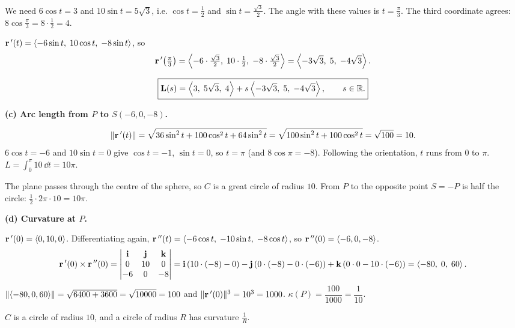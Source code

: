  We need $6\cos t=3$ and $10\sin t=5\sqrt3$, i.e.
$\cos t=\frac12$ and $\sin t=\frac{\sqrt3}{2}$. The angle with these values is
$t=\frac\pi3$. The third coordinate agrees: $8\cos\frac\pi3=8\cdot\frac12=4$.\checkok

 $\mathbf{r}\,'(t)=\left\langle -6\sin t,\;10\cos t,\;-8\sin t \right\rangle$, so
\[
  \mathbf{r}\,'\!\left(\tfrac\pi3\right)=\left\langle -6\cdot\tfrac{\sqrt3}{2},\;10\cdot\tfrac12,\;-8\cdot\tfrac{\sqrt3}{2} \right\rangle
  =\left\langle -3\sqrt3,\;5,\;-4\sqrt3 \right\rangle.
\]

\[
  \boxed{\mathbf L(s)=\left\langle 3,\;5\sqrt3,\;4 \right\rangle+s\left\langle -3\sqrt3,\;5,\;-4\sqrt3 \right\rangle,\qquad s\in\mathbb{R} .}
\]

\textbf{(c) Arc length from $P$ to $S(-6,0,-8)$.}

\[
  \lVert\mathbf{r}\,'(t)\rVert=\sqrt{36\sin^2t+100\cos^2t+64\sin^2t}=\sqrt{100\sin^2t+100\cos^2t}=\sqrt{100}=10 .
\]
 $6\cos t=-6$ and $10\sin t=0$ give $\cos t=-1$, $\sin t=0$,
so $t=\pi$ (and $8\cos\pi=-8$\checkok). Following the orientation, $t$ runs from $0$ to $\pi$.
 $L=\displaystyle\int_0^\pi10\,\dd t=10\pi$.


\begin{altmethod}
The plane passes through the centre of the sphere, so $C$ is a great circle of
radius $10$. From $P$ to the opposite point $S=-P$ is half the circle:
$\frac12\cdot2\pi\cdot10=10\pi$.
\end{altmethod}

\textbf{(d) Curvature at $P$.}

 $\mathbf{r}\,'(0)=\left\langle 0,10,0 \right\rangle$. Differentiating again,
$\mathbf{r}\,''(t)=\left\langle -6\cos t,\;-10\sin t,\;-8\cos t \right\rangle$, so $\mathbf{r}\,''(0)=\left\langle -6,0,-8 \right\rangle$.
\[
  \mathbf{r}\,'(0)\times\mathbf{r}\,''(0)=\begin{vmatrix}\mathbf{i}&\mathbf{j}&\mathbf{k}\\0&10&0\\-6&0&-8\end{vmatrix}
  =\mathbf{i}\,(10\cdot(-8)-0)-\mathbf{j}\,(0\cdot(-8)-0\cdot(-6))+\mathbf{k}\,(0\cdot0-10\cdot(-6))=\left\langle -80,\;0,\;60 \right\rangle.
\]
 $\lVert\left\langle -80,0,60 \right\rangle\rVert=\sqrt{6400+3600}=\sqrt{10000}=100$ and
$\lVert\mathbf{r}\,'(0)\rVert^3=10^3=1000$.
 $\kappa(P)=\dfrac{100}{1000}=\boxed{\dfrac{1}{10}}$.

\begin{altmethod}
$C$ is a circle of radius $10$, and a circle of radius $R$ has curvature $\frac1R$.
\end{altmethod}

